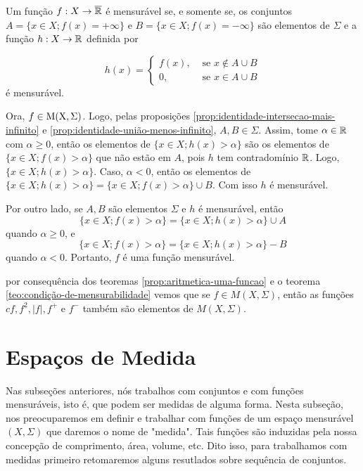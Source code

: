     \begin{theorem}
    \label{teo:condição-de-mensurabilidade}
        Um função $f: X \to \operatorname{\overline{\mathbb{R}}}$ é mensurável se, e somente se, os conjuntos 
        $A = \{ x \in X; f(x) = +\infty\}$ e $B = \{x \in X; f(x) = -\infty\}$
 são elementos de $\Sigma$ e a função $h: X \to \mathbb{R}$ definida por
 
 $$
 h(x) = \left\{\begin{array}{cc}
     f(x), & \textrm{\ se } x \notin A\cup B  \\
      0,& \textrm{\ se } x \in A\cup B
 \end{array}\right.
 $$
 é mensurável.
 \end{theorem}
\begin{prova}
    Ora, $f \in \operatorname{M(X, \Sigma)}$. Logo, pelas proposições \ref{prop:identidade-intersecao-mais-infinito} e \ref{prop:identidade-união-menos-infinito}, $A,B \in \Sigma$.
    Assim, tome $\alpha \in \mathbb{R}$ com $\alpha \geq 0$, então os elementos de $\{x \in X; h(x) > \alpha\}$ são os elementos de $\{x \in X; f(x) > \alpha\}$ que não estão em $A$, pois $h$ tem contradomínio $\mathbb{R}$.
    Logo, $\{x \in X; h(x) > \alpha\}$.
    Caso, $\alpha < 0$, então os elementos de $\{x \in X; h(x) > \alpha\} = \{x \in  X ; f(x) > \alpha\} \cup B $.
    Com isso $h$ é mensurável.

    Por outro lado,  se $A,B$ são elementos $\Sigma$ e $h$ é mensurável, então
    $$\{x \in X; f(x) > \alpha\} = \{x \in  X ; h(x) > \alpha\} \cup A $$
    quando $\alpha \geq 0$, e 
    $$\{x \in X; f(x) > \alpha\} = \{x \in  X ; h(x) > \alpha\} - B $$
    quando  $\alpha < 0$.
    Portanto, $f$ é uma função mensurável.
\end{prova}

por consequência dos teoremas \ref{prop:aritmetica-uma-funcao} e o teorema \ref{teo:condição-de-mensurabilidade} vemos que se $ f \in M(X,\Sigma)$, então as funções $cf, f^2, |f|, f^+$ e $f^-$ também são elementos de $M(X, \Sigma)$.

\section{Espaços de Medida}

Nas subseções anteriores, nós trabalhos com conjuntos e com funções mensuráveis, isto é, que podem ser medidas de alguma forma.
Nesta subseção, nos preocuparemos em definir e trabalhar com funções de um espaço mensurável $(X, \Sigma)$ que daremos o nome de "medida".
Tais funções são induzidas pela nossa concepção de comprimento, área, volume, etc.
Dito isso, para trabalhamos com medidas primeiro retomaremos alguns resutlados sobre sequência de conjuntos.

